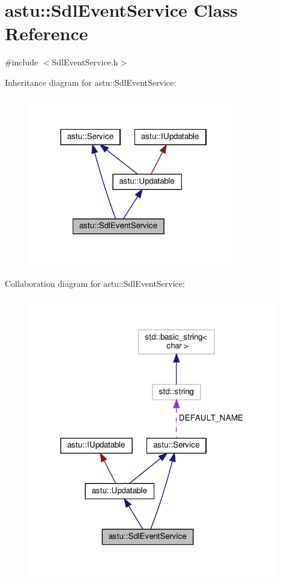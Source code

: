 \hypertarget{classastu_1_1SdlEventService}{}\section{astu\+:\+:Sdl\+Event\+Service Class Reference}
\label{classastu_1_1SdlEventService}


{\ttfamily \#include $<$Sdl\+Event\+Service.\+h$>$}



Inheritance diagram for astu\+:\+:Sdl\+Event\+Service\+:\nopagebreak
\begin{figure}[H]
\begin{center}
\leavevmode
\includegraphics[width=262pt]{classastu_1_1SdlEventService__inherit__graph}
\end{center}
\end{figure}


Collaboration diagram for astu\+:\+:Sdl\+Event\+Service\+:\nopagebreak
\begin{figure}[H]
\begin{center}
\leavevmode
\includegraphics[width=309pt]{classastu_1_1SdlEventService__coll__graph}
\end{center}
\end{figure}
